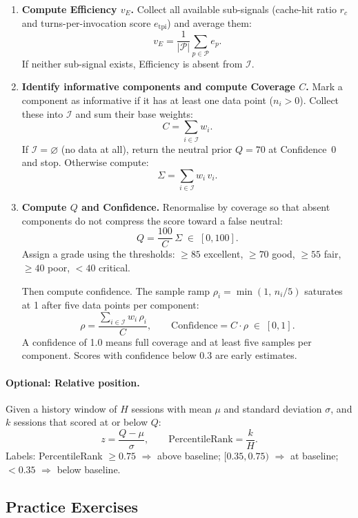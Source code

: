 \documentclass[11pt,a4paper]{article}
\newcommand{\calI}{\mathcal{I}}
\begin{document}
\begin{enumerate}
\item \textbf{Compute Efficiency $v_E$.}
Collect all available sub-signals (cache-hit ratio $r_c$ and
turns-per-invocation score $e_{\mathrm{tpi}}$) and average them:
\[
  v_E = \frac{1}{|\mathcal{P}|}\sum_{p\in\mathcal{P}} e_p.
\]
If neither sub-signal exists, Efficiency is absent from $\calI$.

\item \textbf{Identify informative components and compute Coverage $C$.}
Mark a component as informative if it has at least one data point
($n_i > 0$).  Collect these into $\calI$ and sum their base weights:
\[
  C = \sum_{i\in\calI} w_i.
\]
If $\calI=\varnothing$ (no data at all), return the neutral prior
$Q=70$ at Confidence~0 and stop.  Otherwise compute:
\[
  \Sigma = \sum_{i\in\calI} w_i\,v_i.
\]

\item \textbf{Compute $Q$ and Confidence.}
Renormalise by coverage so that absent components do not compress the
score toward a false neutral:
\[
  Q = \frac{100}{C}\,\Sigma \;\in\; [0,100].
\]
Assign a grade using the thresholds: $\geq85$ excellent, $\geq70$ good,
$\geq55$ fair, $\geq40$ poor, $<40$ critical.

Then compute confidence.  The sample ramp $\rho_i=\min(1,\,n_i/5)$
saturates at 1 after five data points per component:
\[
  \rho = \frac{\displaystyle\sum_{i\in\calI} w_i\,\rho_i}{C},
  \qquad
  \text{Confidence} = C\cdot\rho \;\in\; [0,1].
\]
A confidence of 1.0 means full coverage and at least five samples per
component.  Scores with confidence below 0.3 are early estimates.

\end{enumerate}

\paragraph{Optional: Relative position.}
Given a history window of $H$ sessions with mean $\mu$ and standard
deviation $\sigma$, and $k$ sessions that scored at or below $Q$:
\[
  z = \frac{Q-\mu}{\sigma}, \qquad
  \text{PercentileRank} = \frac{k}{H}.
\]
Labels: PercentileRank $\geq0.75$ $\Rightarrow$ above baseline; $[0.35,0.75)$
$\Rightarrow$ at baseline; $<0.35$ $\Rightarrow$ below baseline.

\subsection{Practice Exercises}
\label{app:exercises}
\end{document}
